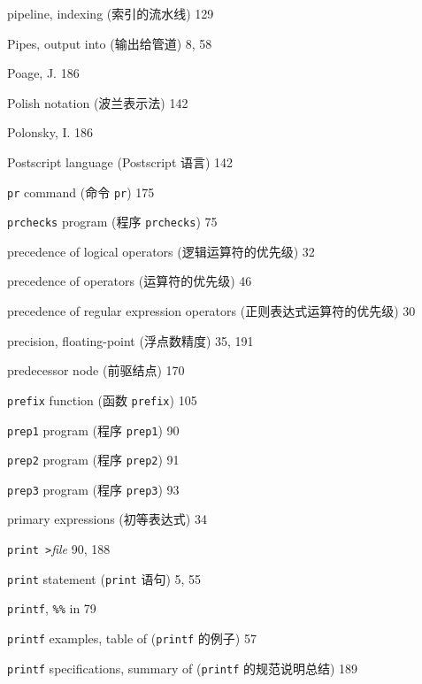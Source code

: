\begin{multicols}{2}
\hangindent=2pc  pipeline, indexing (索引的流水线) 129

\hangindent=2pc  Pipes, output into (输出给管道) 8, 58

\hangindent=2pc  Poage, J. 186

\hangindent=2pc  Polish notation (波兰表示法) 142

\hangindent=2pc  Polonsky, I. 186

\hangindent=2pc  Postscript language (Postscript 语言) 142

\hangindent=2pc  \verb'pr' command (命令 \verb'pr') 175

\hangindent=2pc  \verb'prchecks' program (程序 \verb'prchecks') 75

\hangindent=2pc  precedence of logical operators
(逻辑运算符的优先级) 32

\hangindent=2pc  precedence of operators (运算符的优先级) 46

\hangindent=2pc  precedence of regular expression operators
(正则表达式运算符的优先级) 30

\hangindent=2pc  precision, floating-point (浮点数精度) 35, 191

\hangindent=2pc  predecessor node (前驱结点) 170

\hangindent=2pc  \verb'prefix' function (函数 \verb'prefix') 105

\hangindent=2pc  \verb'prep1' program (程序 \verb'prep1') 90

\hangindent=2pc  \verb'prep2' program (程序 \verb'prep2') 91

\hangindent=2pc  \verb'prep3' program (程序 \verb'prep3') 93

\hangindent=2pc  primary expressions (初等表达式) 34

\hangindent=2pc  \verb'print >'\textit{file} 90, 188

\hangindent=2pc  \verb'print' statement (\verb'print' 语句) 5, 55

\hangindent=2pc  \verb'printf', \verb'%%' in 79

\hangindent=2pc  \verb'printf' examples, table of
(\verb'printf' 的例子) 57

\hangindent=2pc  \verb'printf' specifications, summary of
(\verb'printf' 的规范说明总结) 189


\end{multicols}
